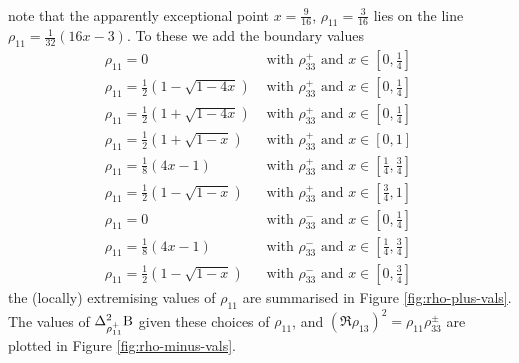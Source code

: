 \begin{subappendices}
\begin{subequations}
\begin{align}
\end{align}
\end{subequations}
note that the apparently exceptional point $x = \frac{9}{16}$, $\rho_{11} = \frac{3}{16}$ lies on the line $\rho_{11} = \frac{1}{32} \left(16 x-3 \right)$. To these we add the boundary values
\begin{subequations}
\label{eqn:rho11-con}
\begin{align}
  \label{eqn:rho-plus-con-1}\rho_{11} = 0 &\text{ with } \rho_{33}^+ \text{ and } x\in\left[0,\frac{1}{4}\right]\\
  \label{eqn:rho-plus-con-2}\rho_{11} = \frac{1}{2}\left(1-\sqrt{1-4x}\right) &\text{ with } \rho_{33}^+ \text{ and } x\in\left[0,\frac{1}{4}\right]\\
  \label{eqn:rho-plus-con-3}\rho_{11} = \frac{1}{2}\left(1+\sqrt{1-4x}\right) &\text{ with } \rho_{33}^+ \text{ and } x\in\left[0,\frac{1}{4}\right]\\
  \label{eqn:rho-plus-con-4}\rho_{11} = \frac{1}{2}\left(1+\sqrt{1-x}\right) &\text{ with } \rho_{33}^+ \text{ and } x\in\left[0,1\right]\\
  \label{eqn:rho-plus-con-5}\rho_{11} = \frac{1}{8}\left(4x-1\right) &\text{ with } \rho_{33}^+ \text{ and } x\in\left[\frac{1}{4},\frac{3}{4}\right]\\  
  \label{eqn:rho-plus-con-6}\rho_{11} = \frac{1}{2}\left(1-\sqrt{1-x}\right) &\text{ with } \rho_{33}^+ \text{ and } x\in\left[\frac{3}{4},1\right]\\
  \label{eqn:rho-minus-con-1}\rho_{11} = 0  &\text{ with } \rho_{33}^- \text{ and } x\in\left[0,\frac{1}{4}\right]\\
  \label{eqn:rho-minus-con-2}\rho_{11} = \frac{1}{8}(4x-1)  &\text{ with } \rho_{33}^- \text{ and } x\in\left[\frac{1}{4},\frac{3}{4}\right]\\
  \label{eqn:rho-minus-con-3}\rho_{11}= \frac{1}{2}(1-\sqrt{1-x}) &\text{ with } \rho_{33}^- \text{ and } x\in\left[0,\frac{3}{4}\right]\
\end{align}
\end{subequations}
the (locally) extremising values of $\rho_{11}$ are summarised in Figure \ref{fig:rho-plus-vals}. The values of $\var[\rho_{11}^+]{\opb}$ given these choices of $\rho_{11}$, and $\left(\Re{\rho_{13}}\right)^2 = \rho_{11}\rho_{33}^\pm$ are plotted in Figure \ref{fig:rho-minus-vals}.
\begin{figure}[ht]\centering
  \begin{subfigure}[t]{0.4\textwidth}

\end{subfigure}
\end{figure}
\end{subappendices}
